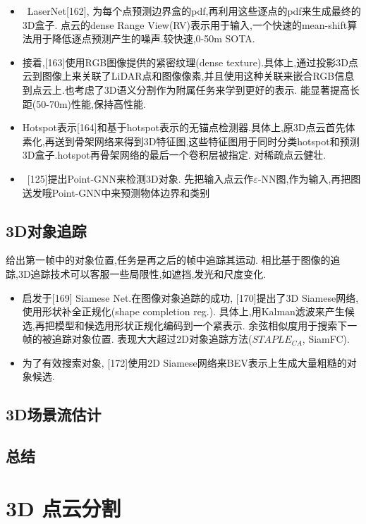 \documentclass{article}
\begin{document}
\begin{itemize}
    \item \ LaserNet[162], 为每个点预测边界盒的pdf,再利用这些逐点的pdf来生成最终的3D盒子. 点云的dense Range View(RV)表示用于输入,一个快速的mean-shift算法用于降低逐点预测产生的噪声.较快速,0-50m SOTA.
    \item 接着,[163]使用RGB图像提供的紧密纹理(dense texture).具体上,通过投影3D点云到图像上来关联了LiDAR点和图像像素,并且使用这种关联来嵌合RGB信息到点云上.也考虑了3D语义分割作为附属任务来学到更好的表示. 能显著提高长距(50-70m)性能,保持高性能.
    \item Hotspot表示[164]和基于hotspot表示的无锚点检测器.具体上,原3D点云首先体素化,再送到骨架网络来得到3D特征图,这些特征图用于同时分类hotspot和预测3D盒子.hotspot再骨架网络的最后一个卷积层被指定. 对稀疏点云健壮.
    \item \ [125]提出Point-GNN来检测3D对象. 先把输入点云作$\varepsilon$-NN图,作为输入,再把图送发哦Point-GNN中来预测物体边界和类别
\end{itemize}

\subsection{3D对象追踪}

给出第一帧中的对象位置,任务是再之后的帧中追踪其运动. 相比基于图像的追踪,3D追踪技术可以客服一些局限性,如遮挡,发光和尺度变化.

\begin{itemize}
    \item 启发于[169] Siamese Net.在图像对象追踪的成功, [170]提出了3D Siamese网络,使用形状补全正规化(shape completion reg.). 具体上,用Kalman滤波来产生候选,再把模型和候选用形状正规化编码到一个紧表示. 余弦相似度用于搜索下一帧的被追踪对象位置. 表现大大超过2D对象追踪方法($STAPLE_{CA}$, SiamFC).
    \item 为了有效搜索对象, [172]使用2D Siamese网络来BEV表示上生成大量粗糙的对象候选.
\end{itemize}



\subsection{3D场景流估计}
\subsection{总结}

\section{3D 点云分割}
\end{document}
